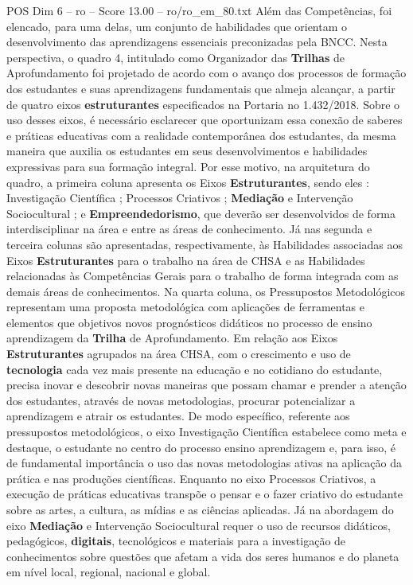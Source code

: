 \begin{textsample}{POS Dim 6 – ro – Score 13.00 – ro/ro\_em\_80.txt}
Além das Competências, foi elencado, para uma delas, um conjunto de habilidades que orientam o desenvolvimento das aprendizagens essenciais preconizadas pela BNCC.
Nesta perspectiva, o quadro 4, intitulado como Organizador das \textbf{Trilhas} de Aprofundamento foi projetado de acordo com o avanço dos processos de formação dos estudantes e suas aprendizagens fundamentais que almeja alcançar, a partir de quatro eixos \textbf{estruturantes} especificados na Portaria no 1.432/2018.
Sobre o uso desses eixos, é necessário esclarecer que oportunizam essa conexão de saberes e práticas educativas com a realidade contemporânea dos estudantes, da mesma maneira que auxilia os estudantes em seus desenvolvimentos e habilidades expressivas para sua formação integral.
Por esse motivo, na arquitetura do quadro, a primeira coluna apresenta os Eixos \textbf{Estruturantes}, sendo eles : Investigação Científica ; Processos Criativos ; \textbf{Mediação} e Intervenção Sociocultural ; e \textbf{Empreendedorismo}, que deverão ser desenvolvidos de forma interdisciplinar na área e entre as áreas de conhecimento.
Já nas segunda e terceira colunas são apresentadas, respectivamente, às Habilidades associadas aos Eixos \textbf{Estruturantes} para o trabalho na área de CHSA e as Habilidades relacionadas às Competências Gerais para o trabalho de forma integrada com as demais áreas de conhecimentos.
Na quarta coluna, os Pressupostos Metodológicos representam uma proposta metodológica com aplicações de ferramentas e elementos que objetivos novos prognósticos didáticos no processo de ensino aprendizagem da \textbf{Trilha} de Aprofundamento.
Em relação aos Eixos \textbf{Estruturantes} agrupados na área CHSA, com o crescimento e uso de \textbf{tecnologia} cada vez mais presente na educação e no cotidiano do estudante, precisa inovar e descobrir novas maneiras que possam chamar e prender a atenção dos estudantes, através de novas metodologias, procurar potencializar a aprendizagem e atrair os estudantes.
De modo específico, referente aos pressupostos metodológicos, o eixo Investigação Científica estabelece como meta e destaque, o estudante no centro do processo ensino aprendizagem e, para isso, é de fundamental importância o uso das novas metodologias ativas na aplicação da prática e nas produções científicas.
Enquanto no eixo Processos Criativos, a execução de práticas educativas transpõe o pensar e o fazer criativo do estudante sobre as artes, a cultura, as mídias e as ciências aplicadas.
Já na abordagem do eixo \textbf{Mediação} e Intervenção Sociocultural requer o uso de recursos didáticos, pedagógicos, \textbf{digitais}, tecnológicos e materiais para a investigação de conhecimentos sobre questões que afetam a vida dos seres humanos e do planeta em nível local, regional, nacional e global.

\end{textsample}
